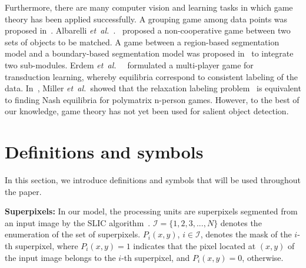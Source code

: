 \documentclass[journal]{IEEEtran}
\newcommand{\etal}{\mbox{\emph{et al.\ }}}
\begin{document}
Furthermore, there are many computer vision and learning tasks in which game theory has been applied successfully. A grouping game among data points was proposed in~\cite{Torsello2006Grouping}. Albarelli \etal.~\cite{Albarelli2009Matching} proposed a non-cooperative game between two sets of objects to be matched. A game between a region-based segmentation model and a boundary-based segmentation model was proposed in~\cite{Chakraborty1999Game} to integrate two sub-modules. Erdem \etal~\cite{Erdem2012Graph} formulated a multi-player game for transduction learning, whereby equilibria correspond to consistent labeling of the data. In~\cite{Miller1991Copositive}, Miller \etal showed that the relaxation labeling problem~\cite{Hummel1983On} is equivalent to finding Nash equilibria for polymatrix n-person games. However, to the best of our knowledge, game theory has not yet been used for salient object detection. 

\section{Definitions and symbols}
\label{def}
In this section, we introduce definitions and symbols that will be  used throughout the paper. 

\noindent \textbf{Superpixels:}
In our model, the processing units are superpixels segmented from an input image by the SLIC algorithm~\cite{Achanta2010SLIC}. $\mathcal{I} = \{1, 2, 3, ..., N\}$ denotes the enumeration of the set of superpixels.  $P_i(x,y)$, $i \in \mathcal{I}$, denotes the mask of the $i$-th superpixel, where $P_i(x, y) = 1$ indicates that the pixel located at $(x, y)$ of the input image belongs to the $i$-th superpixel, and $P_i(x, y) = 0$, otherwise.
\end{document}
